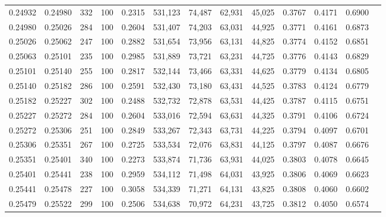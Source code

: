 \begin{tabular}{rrrrrrrrrrrrr}
0.24932 & 0.24980 &   332 & 100 &                                     0.2315 & 531,123 &  74,487 &  62,931 &  45,025 & 0.3767 & 0.4171 & 0.6900 \\
0.24980 & 0.25026 &   284 & 100 &                                     0.2604 & 531,407 &  74,203 &  63,031 &  44,925 & 0.3771 & 0.4161 & 0.6873 \\
0.25026 & 0.25062 &   247 & 100 &                                     0.2882 & 531,654 &  73,956 &  63,131 &  44,825 & 0.3774 & 0.4152 & 0.6851 \\
0.25063 & 0.25101 &   235 & 100 &                                     0.2985 & 531,889 &  73,721 &  63,231 &  44,725 & 0.3776 & 0.4143 & 0.6829 \\
0.25101 & 0.25140 &   255 & 100 &                                     0.2817 & 532,144 &  73,466 &  63,331 &  44,625 & 0.3779 & 0.4134 & 0.6805 \\
0.25140 & 0.25182 &   286 & 100 &                                     0.2591 & 532,430 &  73,180 &  63,431 &  44,525 & 0.3783 & 0.4124 & 0.6779 \\
0.25182 & 0.25227 &   302 & 100 &                                     0.2488 & 532,732 &  72,878 &  63,531 &  44,425 & 0.3787 & 0.4115 & 0.6751 \\
0.25227 & 0.25272 &   284 & 100 &                                     0.2604 & 533,016 &  72,594 &  63,631 &  44,325 & 0.3791 & 0.4106 & 0.6724 \\
0.25272 & 0.25306 &   251 & 100 &                                     0.2849 & 533,267 &  72,343 &  63,731 &  44,225 & 0.3794 & 0.4097 & 0.6701 \\
0.25306 & 0.25351 &   267 & 100 &                                     0.2725 & 533,534 &  72,076 &  63,831 &  44,125 & 0.3797 & 0.4087 & 0.6676 \\
0.25351 & 0.25401 &   340 & 100 &                                     0.2273 & 533,874 &  71,736 &  63,931 &  44,025 & 0.3803 & 0.4078 & 0.6645 \\
0.25401 & 0.25441 &   238 & 100 &                                     0.2959 & 534,112 &  71,498 &  64,031 &  43,925 & 0.3806 & 0.4069 & 0.6623 \\
0.25441 & 0.25478 &   227 & 100 &                                     0.3058 & 534,339 &  71,271 &  64,131 &  43,825 & 0.3808 & 0.4060 & 0.6602 \\
0.25479 & 0.25522 &   299 & 100 &                                     0.2506 & 534,638 &  70,972 &  64,231 &  43,725 & 0.3812 & 0.4050 & 0.6574 \\

\end{tabular}
